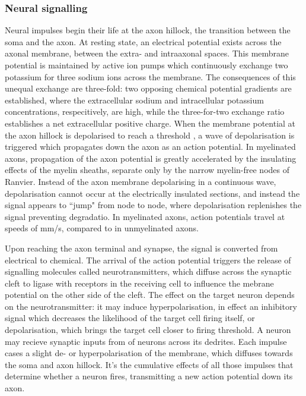\subsubsection{Neural signalling}

Neural impulses begin their life at the axon hillock, the transition between the soma and the axon.
At resting state, an electrical potential exists across the axonal membrane, between the extra- and intraaxonal spaces.
This membrane potential is maintained by active ion pumps  which continuously exchange two potassium for three sodium ions across the membrane.
The consequences of this unequal exchange are three-fold: two opposing chemical potential gradients are established, where the extracellular sodium and intracellular potassium concentrations, respecitively, are high, while the three-for-two exchange ratio establishes a net extracellular positive charge.
When the membrane potential at the axon hillock is depolarised to reach a threshold , a wave of depolarisation is triggered which propagates down the axon as an action potential. 
In myelinated axons, propagation of the axon potential is greatly accelerated by the insulating effects of the myelin sheaths, separate only by the narrow myelin-free nodes of Ranvier.
Instead of the axon membrane depolarising in a continuous wave, depolarisation cannot occur at the electrically insulated sections, and instead the signal appears to ``jump" from node to node, where depolarisation replenishes the signal preventing degradatio. 
In myelinated axons, action potentials travel at speeds of  mm/s, compared to  in unmyelinated axons.

Upon reaching the axon terminal and synapse, the signal is converted from electrical to chemical.
The arrival of the action potential triggers the release of signalling molecules called neurotransmitters, which diffuse across the synaptic cleft to ligase with receptors in the receiving cell to influence the mebrane potential on the other side of the cleft.
The effect on the target neuron depends on the neurotransmitter: it may induce hyperpolarisation, in effect an inhibitory signal which decreases the likelihood of the target cell firing itself, or depolarisation, which brings the target cell closer to firing threshold.
A neuron may recieve synaptic inputs from  of neurons across its dedrites.
Each impulse cases a slight de- or hyperpolarisation of the membrane, which diffuses towards the soma and axon hillock.
It's the cumulative effects of all those impulses that determine whether a neuron fires, transmitting a new action potential down its axon.

